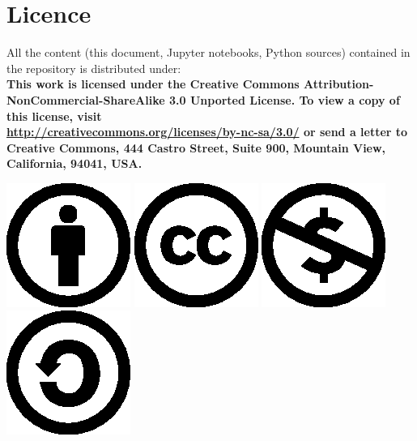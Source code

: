 
\chapter{Licence}

All the content (this document, Jupyter notebooks, Python sources) 
contained in the repository is distributed under:\\
\textbf{
This work is licensed under the Creative Commons
Attribution-NonCommercial-ShareAlike 3.0 Unported License. To view a copy of 
this license, visit
\\\url{http://creativecommons.org/licenses/by-nc-sa/3.0/}  or send a
letter to Creative Commons, 444 Castro Street, Suite 900, Mountain View, 
California, 94041, USA.} 

\begin{center}
\includegraphics{gfx/cc-icons-eps/by}
\includegraphics{gfx/cc-icons-eps/cc}
\includegraphics{gfx/cc-icons-eps/nc}
\includegraphics{gfx/cc-icons-eps/sa}
\end{center}
